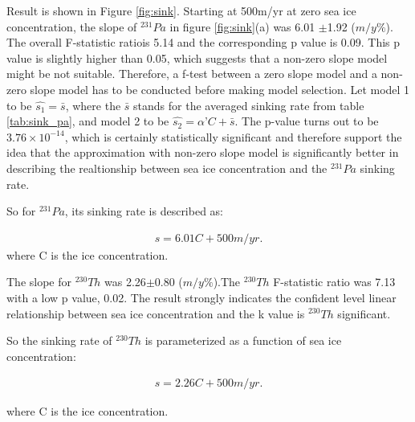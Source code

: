 \documentclass[paper=a4, fontsize=11pt]{scrartcl} %
\numberwithin{equation}{section} %
\numberwithin{figure}{section} %
\numberwithin{table}{section} %
\begin{document}
Result is shown in Figure \ref{fig:sink}. Starting at 500m/yr at zero sea ice concentration, the slope of $^{231}Pa$ in figure \ref{fig:sink}(a) was 6.01 $\pm$1.92 ($m/y\%$).  The overall F-statistic ratio\footnotemark[3] is 5.14 and the corresponding p value is 0.09. This p value is slightly higher than 0.05, which suggests that a non-zero slope model might be not suitable. Therefore, a f-test between a zero slope model and a non-zero slope model has to be conducted before making model selection. Let model 1 to be $\hat {s_{1}}=\bar{s}$, where the $\bar{s}$ stands for the averaged sinking rate from table \ref{tab:sink_pa}, and model 2 to be $\hat {s_{2}}=\alpha$'$ C+\bar{s}$.  The p-value turns out to be $3.76\times 10^{-14}$, which is certainly statistically significant and therefore support the idea that the approximation with non-zero slope model is significantly better in describing the realtionship between sea ice concentration and the $^{231}Pa$ sinking rate.


So for $^{231}Pa$, its sinking rate is described as:

\begin{align}
\label{eq:para_s_func}
s=6.01C+500m/yr.
\end{align}
where C is the ice concentration.

The slope for $^{230}Th$ was 2.26$\pm$0.80 ($m/y\%$).The $^{230}Th$ F-statistic ratio was 7.13 with a low p value, 0.02.  The result strongly indicates the confident level linear relationship between sea ice concentration and the k value is $^{230}Th$ significant.

So the sinking rate of $^{230}Th$ is parameterized as a function of sea ice concentration:

\begin{align}
\label{eq:para_s_func-th}
s=2.26C+500m/yr.
\end{align}

where C is the ice concentration.
\end{document}
